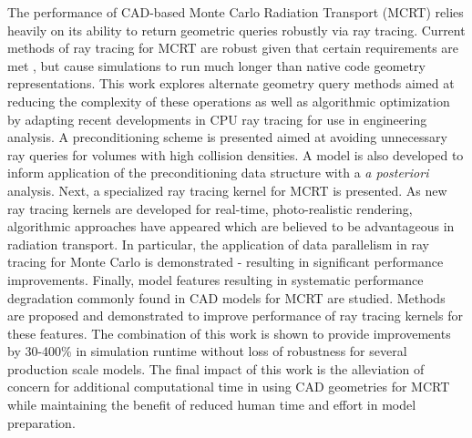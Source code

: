 


The performance of CAD-based Monte Carlo Radiation Transport (MCRT) relies
heavily on its ability to return geometric queries robustly via ray
tracing. Current methods of ray tracing for MCRT are robust given that certain
requirements are met \cite{Smith_2011}, but cause simulations to run much longer
than native code geometry representations. This work explores alternate geometry
query methods aimed at reducing the complexity of these operations as well as
algorithmic optimization by adapting recent developments in CPU ray
tracing for use in engineering analysis. A preconditioning scheme is presented
aimed at avoiding unnecessary ray queries for volumes with high collision
densities. A model is also developed to inform application of the
preconditioning data structure with a \textit{a posteriori} analysis. Next, a
specialized ray tracing kernel for MCRT is presented. As new ray tracing kernels
are developed for real-time, photo-realistic rendering, algorithmic approaches
have appeared which are believed to be advantageous in radiation transport. In
particular, the application of data parallelism in ray tracing for Monte Carlo
is demonstrated - resulting in significant performance improvements. Finally,
model features resulting in systematic performance degradation commonly found in
CAD models for MCRT are studied. Methods are proposed and demonstrated to
improve performance of ray tracing kernels for these features. The combination
of this work is shown to provide improvements by 30-400\% in simulation runtime
without loss of robustness for several production scale models. The final impact
of this work is the alleviation of concern for additional computational time in
using CAD geometries for MCRT while maintaining the benefit of reduced human
time and effort in model preparation.
